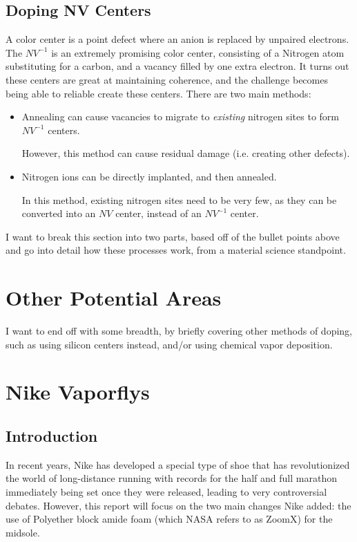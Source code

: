 \documentclass{article}
\begin{document}
    \subsection{Doping NV Centers}
    A color center is a point defect where an anion is replaced by unpaired electrons. The $NV^{-1}$ is an extremely promising color center, consisting of a Nitrogen atom substituting for a carbon, and a vacancy filled by one extra electron. It turns out these centers are great at maintaining coherence, and the challenge becomes being able to reliable create these centers. There are two main methods:
    \begin{itemize}
        \item Annealing can cause vacancies to migrate to \textit{existing} nitrogen sites to form $NV^{-1}$ centers.

        However, this method can cause residual damage (i.e. creating other defects).
        \item Nitrogen ions can be directly implanted, and then annealed.
        
        In this method, existing nitrogen sites need to be very few, as they can be converted into an $NV$ center, instead of an $NV^{-1}$ center.
        \cite{test}
    \end{itemize}
    I want to break this section into two parts, based off of the bullet points above and go into detail how these processes work, from a material science standpoint.
    \section{Other Potential Areas}
    I want to end off with some breadth, by briefly covering other methods of doping, such as using silicon centers instead, and/or using chemical vapor deposition.\cite{bettiol}

    \newpage
    \section{Nike Vaporflys}
    \subsection{Introduction}
    In recent years, Nike has developed a special type of shoe that has revolutionized the world of long-distance running with records for the half and full marathon immediately being set once they were released, leading to very controversial debates. However, this report will focus on the two main changes Nike added: the use of Polyether block amide foam (which NASA refers to as ZoomX) for the midsole.\cite{Hoogkamer2017}
\end{document}
